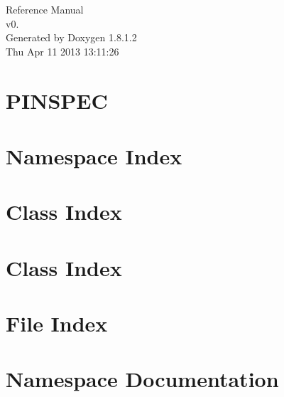 \documentclass{book}
\begin{document}
\hypersetup{pageanchor=false,citecolor=blue}
\begin{titlepage}
\vspace*{7cm}
\begin{center}
{\Large Reference Manual\\[1ex]\large v0. }\\
\vspace*{1cm}
{\large Generated by Doxygen 1.8.1.2}\\
\vspace*{0.5cm}
{\small Thu Apr 11 2013 13:11:26}\\
\end{center}
\end{titlepage}
\clearemptydoublepage
{}
\tableofcontents
\clearemptydoublepage
{}
\hypersetup{pageanchor=true,citecolor=blue}
\chapter{P\-I\-N\-S\-P\-E\-C}
\label{md_README}
\hypertarget{md_README}{}

\chapter{Namespace Index}

\chapter{Class Index}

\chapter{Class Index}

\chapter{File Index}

\chapter{Namespace Documentation}




\end{document}
